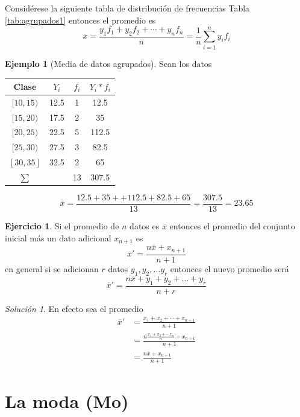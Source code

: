 \documentclass[
  11pt,
]{krantz}
\theoremstyle{definition}
\theoremstyle{definition}
\newtheorem{example}{Ejemplo}[chapter]
\theoremstyle{definition}
\newtheorem{exercise}{Ejercicio}[chapter]
\theoremstyle{definition}
\theoremstyle{remark}
\newtheorem*{solution}{Solución}
\begin{document}
Considérese la siguiente tabla de distribución de frecuencias Tabla \ref{tab:agrupados1} entonces el promedio es \[\overline{x}=\frac{y_1f_1+y_2f_2+\cdots+y_nf_n}{n}=\frac{1}{n}\sum_{i=1}^ny_if_i\]

\begin{example}[Media de datos agrupados]
\protect\hypertarget{exm:media-agrupados}{}\label{exm:media-agrupados}Sean los datos

\begin{longtable}[]{@{}cccc@{}}
\toprule
Clase & \(Y_i\) & \(f_i\) & \(Y_i*f_i\) \\
\midrule
\endhead
\([10,15)\) & 12.5 & 1 & 12.5 \\
\([15,20)\) & 17.5 & 2 & 35 \\
\([20,25)\) & 22.5 & 5 & 112.5 \\
\([25,30)\) & 27.5 & 3 & 82.5 \\
\([30,35]\) & 32.5 & 2 & 65 \\
\(\sum\) & & 13 & 307.5 \\
\bottomrule
\end{longtable}

\[\overline{x}=\frac{12.5+35++112.5+82.5+65}{13}=\frac{307.5}{13}=23.65\]
\end{example}

\begin{exercise}
Si el promedio de \(n\) datos es \(\overline{x}\) entonces el promedio del conjunto inicial más un dato adicional \(x_{n+1}\) es \[\overline{x}'=\frac{n\overline{x}+x_{n+1}}{n+1}\] en general si se adicionan \(r\) datos \(y_1, y_2, \ldots y_r\) entonces el nuevo promedio será \[\overline{x}'=\frac{n\overline{x}+y_{1}+y_2+\ldots+y_r}{n+r}\]
\end{exercise}

\begin{solution}
En efecto sea el promedio
\begin{align*}
\overline{x}'&=\frac{x_1+x_2+\cdots+x_{n+1}}{n+1}\\
&=\frac{n\frac{x_1+x_2+\cdots x_n}{n}+x_{n+1}}{n+1}\\
&=\frac{n\overline{x}+x_{n+1}}{n+1}
\end{align*}
\end{solution}

\hypertarget{la-moda-mo}{%
\section{La moda (Mo)}\label{la-moda-mo}}
\end{document}
